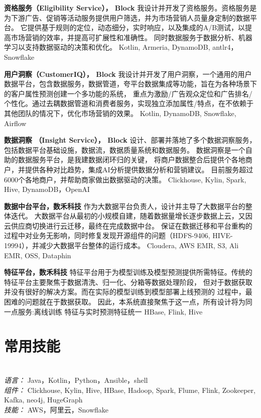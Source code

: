 \documentclass{res}[8.5pt]
\begin{document}
\begin{resume}
\vspace{-25pt}
{\bf 资格服务（Eligibility Service）， Block}
我设计并开发了资格服务。资格服务是为下游广告、促销等活动服务提供用户筛选，并为市场营销人员量身定制的数据平台。
它提供基于规则的定位，动态细分，实时响应，以及集成的A/B测试，以提高市场营销的效率，并提高可扩展性和准确性。
同时数据服务于数据分析、机器学习以支持数据驱动的决策和优化。
Kotlin, Armeria, DynamoDB, antlr4，Snowflake

\vspace{-10pt}
{\bf 用户洞察（CustomerIQ）， Block}
我设计并开发了用户洞察，一个通用的用户数据平台，包含数据服务，数据管道，夸平台数据集成等功能，旨在为各种场景下的客户属性预测创建一个多功能的系统，
重点为激励/广告观众定位和广告排名/个性化。通过去耦数据管道和消费者服务，实现独立添加属性/特点，在不依赖于其他团队的情况下，优化市场营销的效果。
Kotlin, DynamoDB, Snowflake, Airflow

\vspace{-10pt}
{\bf 数据洞察 （Insight Service）， Block}
设计、部署并落地了多个数据洞察服务，包括数据平台基础设施，数据流，数据质量系统和数据服务。
数据洞察是一个自助的数据服务平台，是我建数据闭环归的关键，
将商户数据整合后提供个各地商户，并提供各种对比趋势，集成AI分析提供数据分析和营销建议。
目前服务超过6000个各地商户，并帮助商家做出数据驱动的决策。
Clickhouse, Kylin, Spark, Hive, DynamoDB，OpenAI

\vspace{-10pt}
{\bf 数据中台平台，数禾科技}
作为大数据平台负责人，设计并主导了大数据平台的整体迭代。
大数据平台从最初的小规模自建，随着数据量增长逐步数据上云，又因云供应商切换进行云迁移，最终在完成数据中台。
保证在数据迁移和平台重构的过程中对业务无影响，同时修复发现开源组件的问题（HDFS-9406, HIVE-19994），并减少大数据平台整体的运行成本。
Cloudera, AWS EMR, S3, Ali EMR, OSS, Dataphin

\vspace{-10pt}
{\bf 特征平台，数禾科技}
特征平台用于为模型训练及模型预测提供所需特征。传统的特征平台主要聚焦于数据清洗、归一化、分箱等数据处理阶段，
但对于数据获取并没有很好的解决方案。而在实际的模型训练到模型部署上线预测的 过程中，最困难的问题就在于数据获取。
因此，本系统直接聚焦于这一点，所有设计将为同一点服务:离线训练 特征与实时预测特征统一
HBase, Flink, Hive


\vspace{-10pt}
\section{常用技能}
\vspace{-12pt}
\hrulefill\\
{\sl 语言：}  Java，Kotlin，Python，Ansible，shell\\
{\sl 组件：} Clickhouse, Kylin, Hive, HBase, Hadoop, Spark, Flume, Flink, Zookeeper, Kafka, neo4j, HugeGraph\\
{\sl 技能：} AWS，阿里云，Snowflake


\end{resume}
\end{document}
